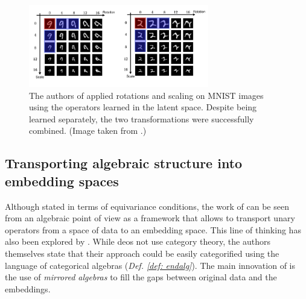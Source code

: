 \documentclass[11pt,a4paper,openright,twoside]{report}
\theoremstyle{plain}
\theoremstyle{definition}
\begin{document}
\begin{figure}[h]
  \begin{center}
    \includegraphics[width=0.7\textwidth]{figures/rotations_and_scaling.png}     
    \caption[Scaling and rotations of MNIST images]{The authors of \cite{chytas2024poolingimagedatasetsmultiple} applied rotations and scaling on MNIST images using the operators learned in the latent space. Despite being learned separately, the two transformations were successfully combined. (Image taken from \cite{chytas2024poolingimagedatasetsmultiple}.)}
    \label{fig: rotationsscaling}
  \end{center}
\end{figure}

\subsection{Transporting algebraic structure into embedding spaces}

Although stated in terms of equivariance conditions, the work of \cite{chytas2024poolingimagedatasetsmultiple} can be seen from an algebraic point of view as a framework that allows to transport unary operators from a space of data to an embedding space. This line of thinking has also been explored by \cite{pfrommer2024transport}. While \cite{pfrommer2024transport} deos not use category theory, the authors themselves state that their approach could be easily categorified using the language of categorical algebras (\textit{Def. \ref{def: endalg}}). The main innovation of \cite{pfrommer2024transport} is the use of \textit{mirrored algebras} to fill the gaps between original data and the embeddings.
\end{document}
